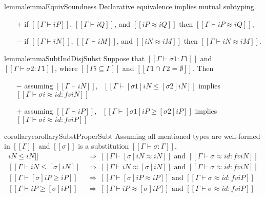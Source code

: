 \begin{restatable}{lemma}{lemmaEquivSoundness}
    \label{lemma:equiv-soundness}
    Declarative equivalence implies mutual subtyping.
    \begin{itemize}
        \item[$+$] if $[[Γ ⊢ iP]]$, $[[Γ ⊢ iQ]]$, and $[[iP ≈ iQ]]$ then $[[Γ ⊢ iP ≈ iQ]]$,
        \item[$-$] if $[[Γ ⊢ iN]]$, $[[Γ ⊢ iM]]$, and $[[iN ≈ iM]]$ then $[[Γ ⊢ iN ≈ iM]]$.
    \end{itemize}
\end{restatable}

\begin{restatable}{lemma}{lemmaSubtIndDisjSubst}
    \label{lemma:subt-ind-disj-subst}
    Suppose that $[[Γ ⊢ σ1 : Γ1]]$ and $[[Γ ⊢ σ2 : Γ1]]$,
    where $[[Γi ⊆ Γ]]$ and $[[Γ1 ∩ Γ2= ∅]]$. Then
    \begin{itemize}
    \item[$-$] assuming $[[Γ ⊢ iN]]$,~
        $[[Γ ⊢ [σ1]iN ≤ [σ2]iN]]$ implies $[[Γ ⊢ σi ≈ id : fv iN]]$
    \item[$+$] assuming $[[Γ ⊢ iP]]$,~
        $[[Γ ⊢ [σ1]iP ≥ [σ2]iP]]$ implies $[[Γ ⊢ σi ≈ id : fv iP]]$
    \end{itemize}
\end{restatable}

\begin{restatable}{corollary}{corollarySubstProperSubt}
    \label{corollary:subst-proper-subt}
    Assuming all mentioned types are well-formed in $[[Γ]]$ and $[[σ]]$ is a
    substitution $[[Γ ⊢ σ : Γ]]$,
    \begin{align*}
        [[Γ ⊢ [σ]iN ≤ iN]] ~&\Rightarrow~ [[Γ ⊢ [σ]iN ≈ iN]]
                                                    \text{ and } [[Γ ⊢ σ ≈ id :  fv iN]] \\
        [[Γ ⊢ iN ≤ [σ]iN]] ~&\Rightarrow~ [[Γ ⊢ iN ≈ [σ]iN]]
                                                    \text{ and } [[Γ ⊢ σ ≈ id :  fv iN]] \\
        [[Γ ⊢ [σ]iP ≥ iP]] ~&\Rightarrow~ [[Γ ⊢ [σ]iP ≈ iP]]
                                                    \text{ and } [[Γ ⊢ σ ≈ id :  fv iP]] \\
        [[Γ ⊢ iP ≥ [σ]iP]] ~&\Rightarrow~ [[Γ ⊢ iP ≈ [σ]iP]]
                                                    \text{ and } [[Γ ⊢ σ ≈ id :  fv iP]] \\
    \end{align*}
\end{restatable}

